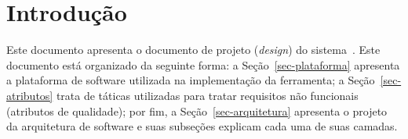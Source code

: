 \chapter{Introdução}
\label{sec-intro}


Este documento apresenta o documento de projeto (\textit{design}) do sistema~\imprimirtitulo. Este documento está organizado da seguinte forma: a Seção~\ref{sec-plataforma} apresenta a plataforma de software utilizada na implementação da ferramenta; a Seção~\ref{sec-atributos} trata de táticas utilizadas para tratar requisitos não funcionais (atributos de qualidade); por fim, a Seção~\ref{sec-arquitetura} apresenta o projeto da arquitetura de software e suas subseções explicam cada uma de suas camadas.
